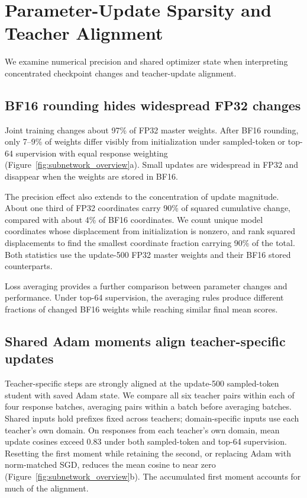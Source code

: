 \section{Parameter-Update Sparsity and Teacher Alignment}
\label{sec:subnetworks}

We examine numerical precision and shared optimizer state when interpreting concentrated checkpoint changes \citep{yu2026denseupdates} and teacher-update alignment.

\subsection{BF16 rounding hides widespread FP32 changes}

Joint training changes about 97\% of FP32 master weights. After BF16 rounding, only 7--9\% of weights differ visibly from initialization under sampled-token or top-64 supervision with equal response weighting (Figure~\ref{fig:subnetwork_overview}a). Small updates are widespread in FP32 and disappear when the weights are stored in BF16.

The precision effect also extends to the concentration of update magnitude. About one third of FP32 coordinates carry 90\% of squared cumulative change, compared with about 4\% of BF16 coordinates. We count unique model coordinates whose displacement from initialization is nonzero, and rank squared displacements to find the smallest coordinate fraction carrying 90\% of the total. Both statistics use the update-500 FP32 master weights and their BF16 stored counterparts.

Loss averaging provides a further comparison between parameter changes and performance. Under top-64 supervision, the averaging rules produce different fractions of changed BF16 weights while reaching similar final mean scores.



\subsection{Shared Adam moments align teacher-specific updates}

Teacher-specific steps are strongly aligned at the update-500 sampled-token student with saved Adam state. We compare all six teacher pairs within each of four response batches, averaging pairs within a batch before averaging batches. Shared inputs hold prefixes fixed across teachers; domain-specific inputs use each teacher's own domain. On responses from each teacher's own domain, mean update cosines exceed 0.83 under both sampled-token and top-64 supervision. Resetting the first moment while retaining the second, or replacing Adam with norm-matched SGD, reduces the mean cosine to near zero (Figure~\ref{fig:subnetwork_overview}b). The accumulated first moment accounts for much of the alignment.

